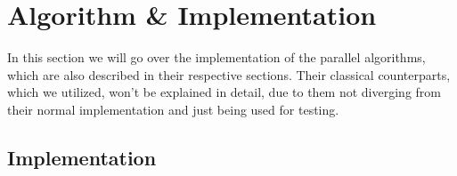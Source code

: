 \documentclass[twocolumn]{article}
\begin{document}
\section{Algorithm \& Implementation}
In this section we will go over the implementation of the parallel algorithms, which are also described in their respective sections. Their classical counterparts, which we utilized, won't be explained in detail, due to them not diverging from their normal implementation and just being used for testing.
\subsection{Implementation}
\end{document}
